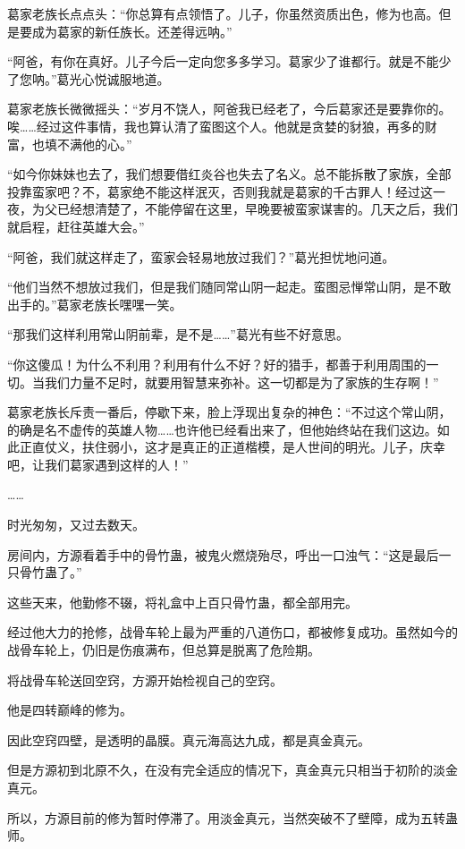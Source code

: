 \begin{this_body}
葛家老族长点点头：“你总算有点领悟了。儿子，你虽然资质出色，修为也高。但是要成为葛家的新任族长。还差得远呐。”

“阿爸，有你在真好。儿子今后一定向您多多学习。葛家少了谁都行。就是不能少了您呐。”葛光心悦诚服地道。

葛家老族长微微摇头：“岁月不饶人，阿爸我已经老了，今后葛家还是要靠你的。唉……经过这件事情，我也算认清了蛮图这个人。他就是贪婪的豺狼，再多的财富，也填不满他的心。”

“如今你妹妹也去了，我们想要借红炎谷也失去了名义。总不能拆散了家族，全部投靠蛮家吧？不，葛家绝不能这样泯灭，否则我就是葛家的千古罪人！经过这一夜，为父已经想清楚了，不能停留在这里，早晚要被蛮家谋害的。几天之后，我们就启程，赶往英雄大会。”

“阿爸，我们就这样走了，蛮家会轻易地放过我们？”葛光担忧地问道。

“他们当然不想放过我们，但是我们随同常山阴一起走。蛮图忌惮常山阴，是不敢出手的。”葛家老族长嘿嘿一笑。

“那我们这样利用常山阴前辈，是不是……”葛光有些不好意思。

“你这傻瓜！为什么不利用？利用有什么不好？好的猎手，都善于利用周围的一切。当我们力量不足时，就要用智慧来弥补。这一切都是为了家族的生存啊！”

葛家老族长斥责一番后，停歇下来，脸上浮现出复杂的神色：“不过这个常山阴，的确是名不虚传的英雄人物……也许他已经看出来了，但他始终站在我们这边。如此正直仗义，扶住弱小，这才是真正的正道楷模，是人世间的明光。儿子，庆幸吧，让我们葛家遇到这样的人！”

……

时光匆匆，又过去数天。

房间内，方源看着手中的骨竹蛊，被鬼火燃烧殆尽，呼出一口浊气：“这是最后一只骨竹蛊了。”

这些天来，他勤修不辍，将礼盒中上百只骨竹蛊，都全部用完。

经过他大力的抢修，战骨车轮上最为严重的八道伤口，都被修复成功。虽然如今的战骨车轮上，仍旧是伤痕满布，但总算是脱离了危险期。

将战骨车轮送回空窍，方源开始检视自己的空窍。

他是四转巅峰的修为。

因此空窍四壁，是透明的晶膜。真元海高达九成，都是真金真元。

但是方源初到北原不久，在没有完全适应的情况下，真金真元只相当于初阶的淡金真元。

所以，方源目前的修为暂时停滞了。用淡金真元，当然突破不了壁障，成为五转蛊师。


\end{this_body}
